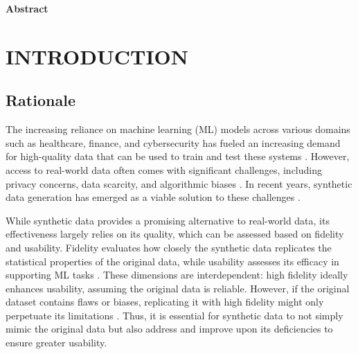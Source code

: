 \documentclass{article}
\begin{document}
\vspace{1em} %

\newpage

\begin{center}
\Large\textbf{Abstract}
\end{center}

\vspace{1em} %

\newpage
\tableofcontents
\thispagestyle{empty} %
\newpage

\setcounter{page}{1}
\section{INTRODUCTION}

\subsection{Rationale}
The increasing reliance on machine learning (ML) models across various domains such as healthcare, finance, and cybersecurity has fueled an increasing demand for high-quality data that can be used to train and test these systems \parencite{jordon_synthetic_2022, goyal_systematic_2024}. However, access to real-world data often comes with significant challenges, including privacy concerns, data scarcity, and algorithmic biases \parencite{lu_machine_2024, hudovernik_benchmarking_2024}. In recent years, synthetic data generation has emerged as a viable solution to these challenges \parencite{goyal_systematic_2024}.

While synthetic data provides a promising alternative to real-world data, its effectiveness largely relies on its quality, which can be assessed based on fidelity and usability. Fidelity evaluates how closely the synthetic data replicates the statistical properties of the original data, while usability assesses its efficacy in supporting ML tasks \parencite{loni_review_2025}. These dimensions are interdependent: high fidelity ideally enhances usability, assuming the original data is reliable. However, if the original dataset contains flaws or biases, replicating it with high fidelity might only perpetuate its limitations \parencite{shahul_hameed_bias_2024}. Thus, it is essential for synthetic data to not simply mimic the original data but also address and improve upon its deficiencies to ensure greater usability.
\end{document}

